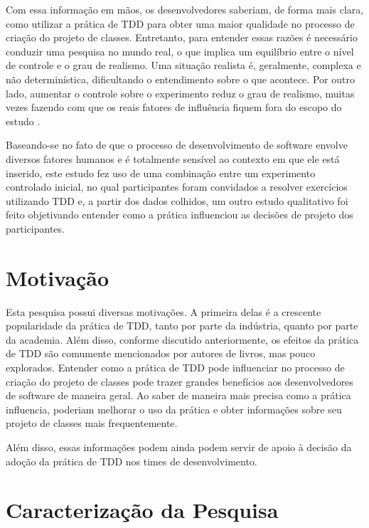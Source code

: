 Com essa informação em mãos, os desenvolvedores saberiam, de forma mais clara,
como utilizar a prática de TDD para obter uma maior qualidade no processo de criação
do projeto de classes. Entretanto, para entender essas razões é necessário
conduzir uma pesquisa no mundo real, o que  
implica um equilíbrio entre o nível de controle
e o grau de realismo. Uma situação realista é, geralmente, complexa e 
não determinística, dificultando o entendimento sobre o que acontece. Por outro
lado, aumentar o controle sobre o experimento reduz o grau de realismo, muitas
vezes fazendo com que os reais fatores de influência fiquem fora do escopo do 
estudo \cite{guidelines-case-study}.

Baseando-se no fato de que o processo de desenvolvimento de software envolve 
diversos fatores humanos e é totalmente sensível ao contexto em que ele está 
inserido, 
este estudo fez uso de uma combinação entre um experimento controlado inicial, 
no qual participantes foram convidados a resolver exercícios utilizando TDD e, 
a partir dos dados colhidos, um outro estudo qualitativo foi 
feito objetivando entender como a prática influenciou as decisões de projeto 
dos participantes.

\section{Motivação}

Esta pesquisa possui diversas motivações. A primeira delas é a crescente
popularidade da prática de TDD, tanto por parte da indústria, quanto 
por parte da academia. Além disso,
conforme discutido anteriormente, os efeitos da prática de TDD são
comumente mencionados por autores de livros, mas pouco explorados. 
Entender como a prática de TDD pode influenciar no processo
de criação do projeto de classes pode trazer grandes benefícios
aos desenvolvedores de software de maneira geral.
Ao saber de maneira mais precisa
como a prática influencia, poderiam melhorar o uso da prática e obter
informações sobre seu projeto de classes mais frequentemente.

Além disso, essas informações podem ainda podem servir de apoio à decisão da 
adoção da prática de TDD nos times de desenvolvimento.


\section{Caracterização da Pesquisa}

